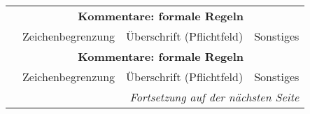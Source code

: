 
\begin{landscape} \footnotesize
  \begin{longtable}{l|llp{100mm}}

  & \multicolumn{3}{c}{\bfseries Kommentare: formale Regeln} \\
  & Zeichenbegrenzung & Überschrift (Pflichtfeld) & Sonstiges \\\hline
  \endfirsthead

  & \multicolumn{3}{c}{\bfseries Kommentare: formale Regeln} \\
  & Zeichenbegrenzung & Überschrift (Pflichtfeld) & Sonstiges \\\hline
  \endhead

  \hline \multicolumn{4}{r}{\emph{Fortsetzung auf der nächsten Seite}}
  \endfoot

  \hline
  \endlastfoot


\end{longtable}
\end{landscape}
